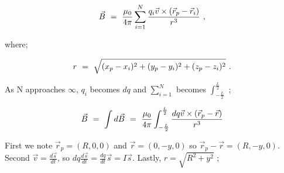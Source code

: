 \documentclass{article}
\begin{document}
\begin{equation} \label{eb-eq-51-2}
\vec{B} \hspace{0.125cm} = \hspace{0.125cm} \frac{\mu_{0}}{4 \pi} \sum_{i=1}^{N} \frac{q_{i} \vec{v} \times (\vec{r}_{p} - \vec{r}_{i})}{r^3} \hspace{0.125cm} ,
\end{equation}

where;

\begin{equation} \label{eb-eq-51-3}
r \hspace{0.125cm} = \hspace{0.125cm} \sqrt{ (x_p - x_i)^2 + (y_p - y_i)^2 + (z_p - z_i)^2} \hspace{0.125cm} .
\end{equation}

As N approaches \begin{math} \infty \end{math}, \begin{math} q_i \end{math} becomes \begin{math} dq \end{math} and \begin{math} \sum_{i=1}^{N} \end{math} becomes \begin{math} \int_{-\frac{L}{2}}^{\frac{L}{2}} \end{math} ;

\begin{equation} \label{eb-eq-51-4}
\vec{B} \hspace{0.125cm} = \hspace{0.125cm} \int d \vec{B} \hspace{0.125cm} = \hspace{0.125cm} \frac{\mu_{0}}{4 \pi} \int_{-\frac{L}{2}}^{\frac{L}{2}} \frac{dq \vec{v} \times (\vec{r}_{p} - \vec{r})}{r^3}
\end{equation}

First we note \begin{math} \vec{r}_p = (R, 0, 0) \end{math} and \begin{math} \vec{r} = (0, -y, 0) \end{math} so \begin{math} \vec{r}_{p} - \vec{r} = (R, -y, 0) \end{math}. Second \begin{math} \vec{v} = \frac{d \vec{s}}{dt} \end{math}, so \begin{math} dq \frac{d \vec{s}}{dt} = \frac{dq}{dt} \vec{s} = I \vec{s} \end{math}. Lastly, \begin{math} r = \sqrt{ R^2 + y^2} \end{math} ;
\end{document}
